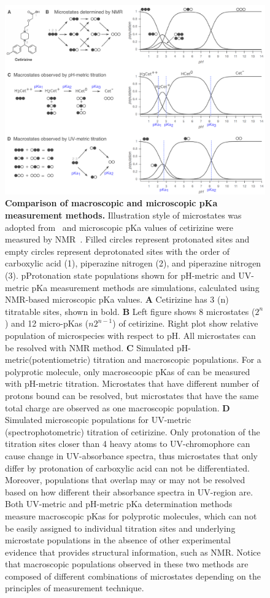 \documentclass[9pt,lineno]{elife}
\begin{document}
\begin{figure}
\begin{center}
\includegraphics[width=1.00\linewidth]{figures/microscopic_vs_macroscopic_populations_figure.pdf}
\caption{{\bf Comparison of macroscopic and microscopic pKa measurement methods.}  Illustration style of microstates was adopted from~\citep{rupp_predicting_2011} and microscopic pKa values of cetirizine were measured by NMR~\citep{marosi_triprotic_2009}. Filled circles represent protonated sites and empty circles represent deprotonated sites with the order of carboxylic acid (1), piperazine nitrogen (2), and piperazine nitrogen (3). pProtonation state populations shown for pH-metric and UV-metric pKa measurement methods are simulations, calculated using NMR-based microscopic pKa values. \textbf{A} Cetirizine has 3 (n) titratable sites, shown in bold. \textbf{B} Left figure shows 8 microstates ($2^n$) and 12 micro-pKas ($n2^{n-1}$) of cetirizine. Right plot show relative population of microspecies with respect to pH. All microstates can be resolved with NMR method. \textbf{C} Simulated pH-metric(potentiometric) titration and macroscopic populations. For a polyprotic molecule, only macroscoopic pKas of can be measured with pH-metric titration. Microstates that have different number of protons bound can be resolved, but microstates that have the same total charge are observed as one macroscopic population. \textbf{D} Simulated microscopic populations for UV-metric (spectrophotometric) titration of cetirizine. Only protonation of the titration sites closer than 4 heavy atoms to UV-chromophore can cause change in UV-absorbance spectra, thus microstates that only differ by protonation of carboxylic acid can not be differentiated. Moreover, populations that overlap may or may not be resolved based on how different their absorbance spectra in UV-region are. Both UV-metric and pH-metric pKa determination methods measure macroscopic pKas for polyprotic molecules, which can not be easily assigned to individual titration sites and underlying microstate populations in the absence of other experimental evidence that provides structural information, such as NMR. Notice that macroscopic populations observed in these two methods are composed of different combinations of microstates depending on the principles of measurement technique.
}
\end{center}
\end{figure}
\end{document}

